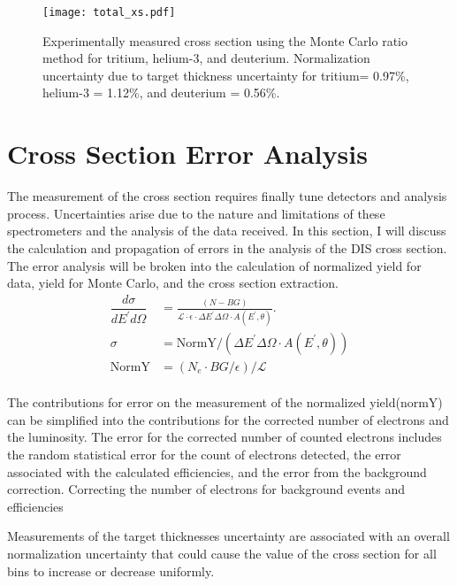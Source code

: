 \begin{figure}
	\texttt{[image: total\_xs.pdf]}
	\caption{Experimentally measured cross section using the Monte Carlo ratio method for tritium, helium-3, and deuterium. Normalization uncertainty due to target thickness uncertainty for tritium= 0.97\%, helium-3 = 1.12\%, and deuterium = 0.56\%. \label{CCplot}}
\end{figure}

\section{Cross Section Error Analysis}
The measurement of the cross section requires finally tune detectors and analysis process. Uncertainties arise due to the nature and limitations of these spectrometers and the analysis of the data received. In this section, I will discuss the calculation and propagation of errors in the analysis of the DIS cross section. The error analysis will be broken into the calculation of normalized yield for data, yield for Monte Carlo, and the cross section extraction. 
\begin{align}
\dfrac{d\sigma}{dE^{\prime}d\Omega} &= \frac{(N - BG)}{\mathscr{L} \cdot \epsilon \cdot \Delta E^{\prime} \Delta \Omega \cdot A(E^{\prime},\theta)}. \nonumber\\
\sigma &= \text{NormY}/\left(\Delta E^{\prime} \Delta \Omega \cdot A(E^{\prime},\theta)\right)\nonumber\\
\text{NormY} &= \left(N_e \cdot BG/\epsilon \right) / \mathscr{L}
\end{align}
\paragraph{}
The contributions for error on the measurement of the normalized yield(normY) can be simplified into the contributions for the corrected number of electrons and the luminosity. The error for the corrected number of counted electrons includes the random statistical error for the count of electrons detected, the error associated with the calculated efficiencies, and the error from the background correction.   Correcting the number of electrons for background events and efficiencies

Measurements of the target thicknesses uncertainty are associated with an overall normalization uncertainty that could cause the value of the cross section for all bins to increase or decrease uniformly.



